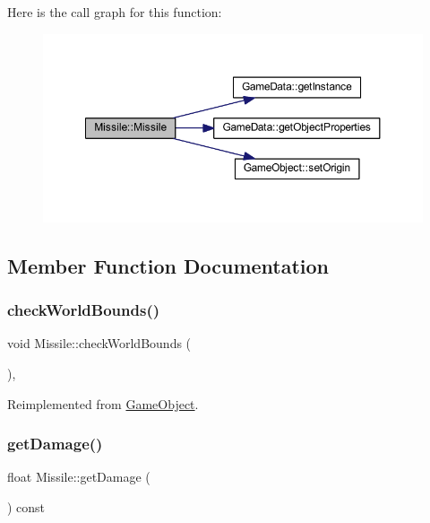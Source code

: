 Here is the call graph for this function\+:
\nopagebreak
\begin{figure}[H]
\begin{center}
\leavevmode
\includegraphics[width=350pt]{class_missile_a74052851a2f92d2045198c19171c1dbb_cgraph}
\end{center}
\end{figure}


\subsection{Member Function Documentation}
\mbox{\label{class_missile_a49c9929ea51ad8a2a8da96e0c39e6095}} 
\subsubsection{\texorpdfstring{check\+World\+Bounds()}{checkWorldBounds()}}
{\footnotesize\ttfamily void Missile\+::check\+World\+Bounds (\begin{DoxyParamCaption}{ }\end{DoxyParamCaption})\hspace{0.3cm}{\ttfamily [override]}, {\ttfamily [virtual]}}



Reimplemented from \hyperlink{class_game_object_a07bcaf0d87bd507f0a6e98abebd70e53}{Game\+Object}.

\mbox{\label{class_missile_ae07a94126a1475af4349006dc825dae9}} 
\subsubsection{\texorpdfstring{get\+Damage()}{getDamage()}}
{\footnotesize\ttfamily float Missile\+::get\+Damage (\begin{DoxyParamCaption}{ }\end{DoxyParamCaption}) const}

